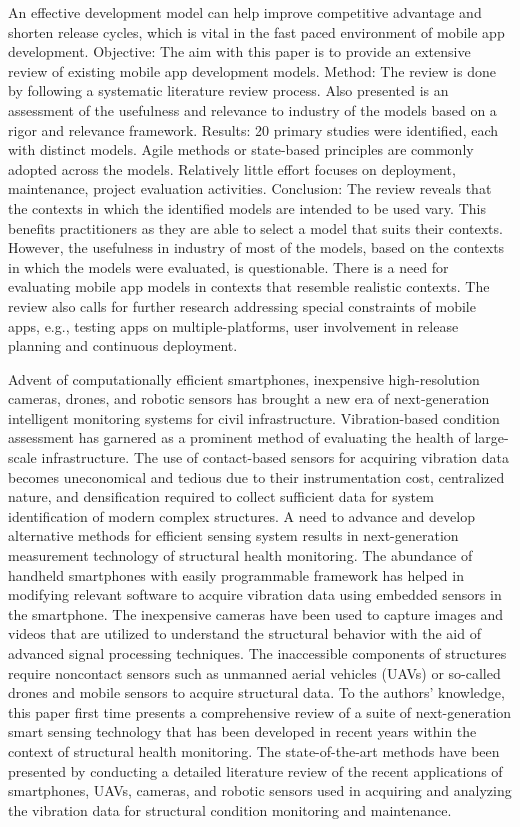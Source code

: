 \documentclass{article}
\begin{document}
An effective development model can help improve competitive advantage and shorten release cycles,
which is vital in the fast paced environment of mobile app development.
Objective: The aim with this paper is to provide an extensive review of existing mobile app development
models.
Method: The review is done by following a systematic literature review process. Also presented is an assessment of the usefulness and relevance to industry of the models based on a rigor and relevance framework.
Results: 20 primary studies were identified, each with distinct models. Agile methods or state-based principles
are commonly adopted across the models. Relatively little effort focuses on deployment, maintenance, project
evaluation activities.
Conclusion: The review reveals that the contexts in which the identified models are intended to be used vary.
This benefits practitioners as they are able to select a model that suits their contexts. However, the usefulness in
industry of most of the models, based on the contexts in which the models were evaluated, is questionable. There
is a need for evaluating mobile app models in contexts that resemble realistic contexts. The review also calls for
further research addressing special constraints of mobile apps, e.g., testing apps on multiple-platforms, user
involvement in release planning and continuous deployment.\cite{jabangwe2018software}

\medskip
Advent of computationally efficient smartphones, inexpensive high-resolution cameras, drones, and robotic sensors has brought a new era of next-generation intelligent monitoring systems for civil infrastructure. Vibration-based condition assessment has garnered as a prominent method of evaluating the health of large-scale infrastructure. The use of contact-based sensors for acquiring vibration data becomes uneconomical and tedious due to their instrumentation cost, centralized nature, and densification required to collect sufficient data for system identification of modern complex structures. A need to advance and develop alternative methods for efficient sensing system results in next-generation measurement technology of structural health monitoring. The abundance of handheld smartphones with easily programmable framework has helped in modifying relevant software to acquire vibration data using embedded sensors in the smartphone. The inexpensive cameras have been used to capture images and videos that are utilized to understand the structural behavior with the aid of advanced signal processing techniques. The inaccessible components of structures require noncontact sensors such as unmanned aerial vehicles (UAVs) or so-called drones and mobile sensors to acquire structural data. To the authors' knowledge, this paper first time presents a comprehensive review of a suite of next-generation smart sensing technology that has been developed in recent years within the context of structural health monitoring. The state-of-the-art methods have been presented by conducting a detailed literature review of the recent applications of smartphones, UAVs, cameras, and robotic sensors used in acquiring and analyzing the vibration data for structural condition monitoring and maintenance.
\end{document}
